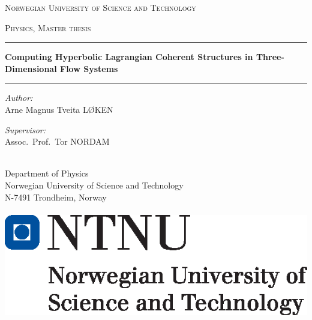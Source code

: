\begingroup
{}
\begin{titlingpage}
    \begin{center}
        \vspace*{.04\textheight}
        {\scshape \fontsize{17pt}{17pt}\selectfont Norwegian University of Science and Technology\par}%
        \vspace{0.75cm}\textsc{\large Physics, Master thesis}\vspace{0.4cm}

        \hrule\phantom{}\vspace{0.4cm}
        {\LARGE \bfseries Computing Hyperbolic Lagrangian Coherent Structures
            in Three-Dimensional Flow Systems
        \par}\vspace{0.8cm}
        \hrule\phantom{}\vspace{1cm}

        \begin{minipage}[t]{0.45\textwidth}
            \begin{flushleft}\large
                \emph{Author:}\\
                Arne Magnus Tveita LØKEN
            \end{flushleft}
        \end{minipage}
        \begin{minipage}[t]{0.45\textwidth}
            \begin{flushright}\large
                \emph{Supervisor:}\\
                Assoc.\ Prof.\ Tor NORDAM
            \end{flushright}
        \end{minipage}\\[2cm]


        \large {Department of Physics\\%
            Norwegian University of Science and Technology\\%
        N-7491 Trondheim, Norway}\\[1.5cm]
        \begingroup
        {\large \mydate}\\[0.5cm]
        \endgroup
        \includegraphics{titlepage/hovedlogo_eng.eps}
    \end{center}
\end{titlingpage}
\endgroup
\cleartorecto
